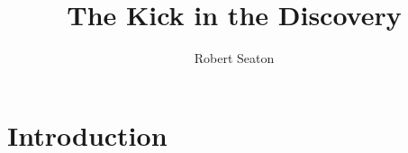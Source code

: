 \documentclass{tufte-book}
\author{Robert Seaton}
\title{The Kick in the Discovery}
\begin{document}
\maketitle
\frontmatter
\tableofcontents

\chapter*{Introduction}


\mainmatter
%
%
%
%
%

\backmatter
% 
% 

\printindex %
\end{document}
